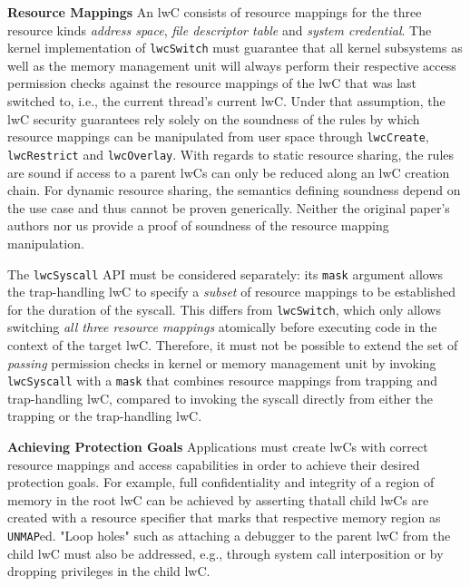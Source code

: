 \documentclass[10pt,twocolumn,a4paper]{article}
\begin{document}
\textbf{Resource Mappings}\hspace{1em}
An lwC consists of resource mappings for the three resource kinds \textit{address space}, \textit{file descriptor table} and \textit{system credential}.
The kernel implementation of \texttt{lwcSwitch} must guarantee that all kernel subsystems as well as the memory management unit will always perform their respective access permission checks against the resource mappings of the lwC that was last switched to, i.e., the current thread's current lwC.
Under that assumption, the lwC security guarantees rely solely on the soundness of the rules by which resource mappings can be manipulated from user space through \lstinline{lwcCreate}, \lstinline{lwcRestrict} and \lstinline{lwcOverlay}.
With regards to static resource sharing, the rules are sound if access to a parent lwCs can only be reduced along an lwC creation chain.
For dynamic resource sharing, the semantics defining soundness depend on the use case and thus cannot be proven generically.
Neither the original paper's authors nor us provide a proof of soundness of the resource mapping manipulation.

The \lstinline{lwcSyscall} API must be considered separately:
its \lstinline{mask} argument allows the trap-handling lwC to specify a \textit{subset} of resource mappings to be established for the duration of the syscall.
This differs from \lstinline{lwcSwitch}, which only allows switching \textit{all three resource mappings} atomically before executing code in the context of the target lwC.
Therefore, it must not be possible to extend the set of \textit{passing} permission checks in kernel or memory management unit by invoking \lstinline{lwcSyscall} with a \lstinline{mask} that combines resource mappings from trapping and trap-handling lwC, compared to invoking the syscall directly from either the trapping or the trap-handling lwC.


\textbf{Achieving Protection Goals}\hspace{1em}
Applications must create lwCs with correct resource mappings and access capabilities in order to achieve their desired protection goals.
For example, full confidentiality and integrity of a region of memory in the root lwC can be achieved by asserting thatall child lwCs are created with a resource specifier that marks that respective memory region as \lstinline{UNMAP}ed.
"Loop holes" such as attaching a debugger to the parent lwC from the child lwC must also be addressed, e.g., through system call interposition or by dropping privileges in the child lwC.
\end{document}
